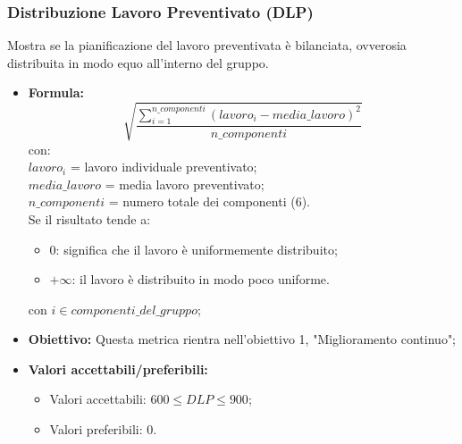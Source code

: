 \subsubsection{Distribuzione Lavoro Preventivato (DLP)}
Mostra se la pianificazione del lavoro preventivata è bilanciata, ovverosia distribuita in modo equo all'interno del gruppo.
\begin{itemize}
	\item \textbf{Formula:}\[\sqrt{\frac{\sum_{i=1}^{n\_componenti}(lavoro_i-media\_lavoro)^2}{n\_componenti}}\]
	con:\\
	$lavoro_i$ = lavoro individuale preventivato;\\
	$media\_lavoro$ = media lavoro preventivato;\\
	$n\_componenti$ = numero totale dei componenti (6).
	\\Se il risultato tende a:
	\begin{itemize}
		\item 0: significa che il lavoro è uniformemente distribuito;
		\item $+\infty$: il lavoro è distribuito in modo poco uniforme.
	\end{itemize}
	con $i \in {componenti\_del\_gruppo}$;
	\item \textbf{Obiettivo:} Questa metrica rientra nell'obiettivo 1, "Miglioramento continuo";
	\item \textbf{Valori accettabili/preferibili: }
	\begin{itemize}
		\item Valori accettabili: $600 \leq DLP \leq 900$;
		\item Valori preferibili: $0$.
	\end{itemize}
\end{itemize}

